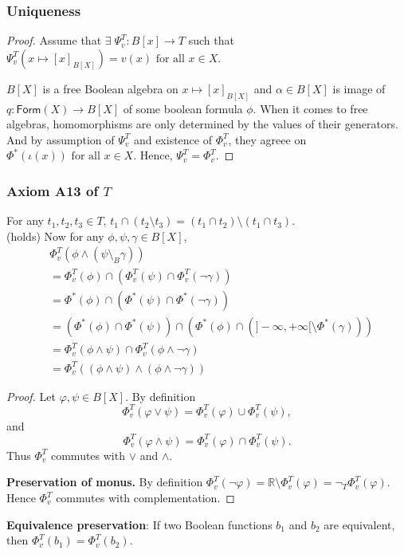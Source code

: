 \subsubsection*{Uniqueness}
\begin{proof}
Assume that $\exists\;\Psi_v^T:B[x]\rightarrow T$ such that $\Psi_v^T(x\mapsto [x]_{B[X]})=v(x)\text{ for all }x \in X$.

$B[X]$ is a free Boolean algebra on $x\mapsto [x]_{B[X]}$  and $\alpha \in B[X]$ is image of $q:\mathsf{Form}(X)\rightarrow B[X]$ of some boolean formula $\phi$. 
When it comes to free algebras, homomorphisms are only determined by the values of their generators. 
And by assumption of $\Psi_v^T$ and existence of $\Phi_v^T$, they agreee on $\Phi^*(\iota(x)) \text{ for all } x \in X$. Hence, $\Psi_v^T=\Phi_v^T$.
\end{proof}
\subsubsection*{Axiom A13 of $T$}
For any $t_1,t_2,t_3 \in T$, $t_1 \cap (t_2 \setminus t_3) = (t_1 \cap t_2) \setminus (t_1 \cap t_3)$.\\ (holds)
Now for any $\phi, \psi, \gamma \in B[X]$,
\[
\begin{aligned}
&\Phi_v^T(\phi \wedge (\psi \setminus_B \gamma))\\ 
&= \Phi_v^T(\phi) \cap (\Phi_v^T(\psi) \cap \Phi_v^T(\neg \gamma)) \\
&= \Phi^*(\phi) \cap (\Phi^*(\psi) \cap \Phi^*(\neg \gamma)) \\
&= (\Phi^*(\phi) \cap \Phi^*(\psi)) \cap (\Phi^*(\phi) \cap (]-\infty,+\infty[ \setminus \Phi^*(\gamma))) \\
&= \Phi_v^T(\phi \wedge \psi) \cap \Phi_v^T(\phi \wedge \neg \gamma) \\
&= \Phi_v^T((\phi \wedge \psi) \wedge (\phi \wedge \neg \gamma))
\end{aligned}
\]

\begin{proof}
Let \(\varphi,\psi\in B[X]\). By definition
\[
\Phi_v^T(\varphi\vee\psi)=\Phi_v^T(\varphi)\cup\Phi_v^T(\psi),
\]and
\[
\Phi_v^T(\varphi\wedge\psi)=\Phi_v^T(\varphi)\cap\Phi_v^T(\psi).
\]
Thus \(\Phi_v^T\) commutes with \(\vee\) and \(\wedge\).

\textbf{Preservation of monus.}
By definition \(\Phi_v^T(\neg\varphi)=\mathbb{R}\setminus\Phi_v^T(\varphi)=\neg_T\Phi_v^T(\varphi)\). Hence \(\Phi_v^T\) commutes with complementation.

\end{proof}
\textbf{Equivalence preservation}:\newline
If two Boolean functions $b_1$ and $b_2$ are equivalent, then $\Phi_v^T(b_1) = \Phi_v^T(b_2)$.




